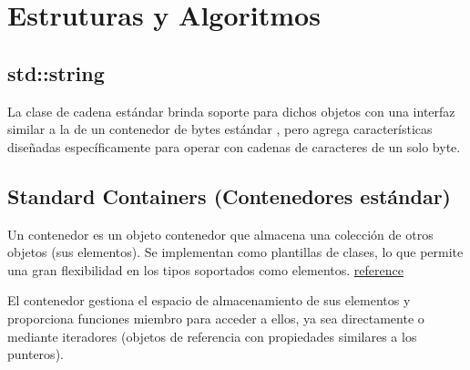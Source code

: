 \documentclass[../main.tex]{subfiles}
\begin{document}
\section{Estruturas y Algoritmos} 
    \subsection{std::string}
        La clase de cadena estándar brinda soporte para dichos objetos con una interfaz similar a la de un contenedor de bytes estándar , pero agrega características diseñadas específicamente para operar con cadenas de caracteres de un solo byte.

    \subsection{Standard Containers (Contenedores estándar)}
        Un contenedor es un objeto contenedor que almacena una colección de otros objetos (sus elementos). Se implementan como plantillas de clases, lo que permite una gran flexibilidad en los tipos soportados como elementos. \href{https://cplusplus.com/reference/stl/}{reference}

        El contenedor gestiona el espacio de almacenamiento de sus elementos y proporciona funciones miembro para acceder a ellos, ya sea directamente o mediante iteradores (objetos de referencia con propiedades similares a los punteros).

       
\end{document}
